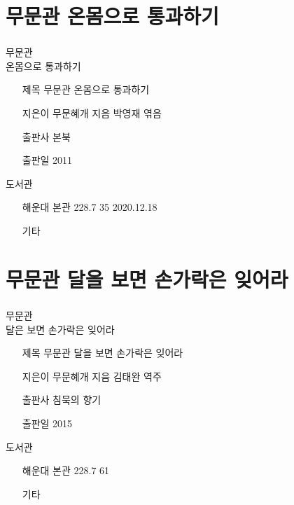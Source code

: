 \documentclass[aspectratio=1610,17pt,xcolor=pdftex,dvipsnames,table,handout]{beamer}
\begin{document}
		\section{ 무문관 온몸으로 통과하기}
		\begin{frame} [t,plain]
		\frametitle{}

			\begin{block} {무문관 \\ 온몸으로 통과하기}
			\setlength{\leftmargini}{4em}			
			\begin{itemize}
				\item [제목]  	무문관 온몸으로 통과하기
				\item [지은이]	무문혜개 지음 박영재 엮음
				\item [출판사]	본북
				\item [출판일]	2011
			\end{itemize}
			\end{block}						

			\begin{block} {도서관}
			\setlength{\leftmargini}{4em}			
			\begin{itemize}
				\item [해운대]  	본관 228.7 35  2020.12.18
				\item [기타]	
			\end{itemize}
			\end{block}						

		\end{frame}						


		\section{무문관 달을 보면 손가락은 잊어라}
		\begin{frame} [t,plain]
		\frametitle{}

			\begin{block} {무문관 \\ 달은 보면 손가락은 잊어라}
			\setlength{\leftmargini}{4em}			
			\begin{itemize}
				\item [제목]  	무문관 달을 보면 손가락은 잊어라
				\item [지은이]	무문혜개 지음 김태완 역주
				\item [출판사]	침묵의 향기
				\item [출판일]	2015
			\end{itemize}
			\end{block}						

			\begin{block} {도서관}
			\setlength{\leftmargini}{4em}			
			\begin{itemize}
				\item [해운대]  	본관 228.7 61
				\item [기타]	
			\end{itemize}
			\end{block}						

		\end{frame}						
\end{document}
